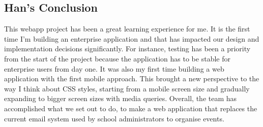 \documentclass[10pt,a4paper]{article}
\begin{document}
\subsection{Han's Conclusion}
This webapp project has been a great learning experience for me. It is the first time I’m building an enterprise application and that has impacted our design and implementation decisions significantly. For instance, testing has been a priority from the start of the project because the application has to be stable for enterprise users from day one. It was also my first time building a web application with the first mobile approach. This brought a new perspective to the way I think about CSS styles, starting from a mobile screen size and gradually expanding to bigger screen sizes with media queries. Overall, the team has accomplished what we set out to do, to make a web application that replaces the current email system used by school administrators to organise events.

\appendix
\label{appendix}
\end{document}
